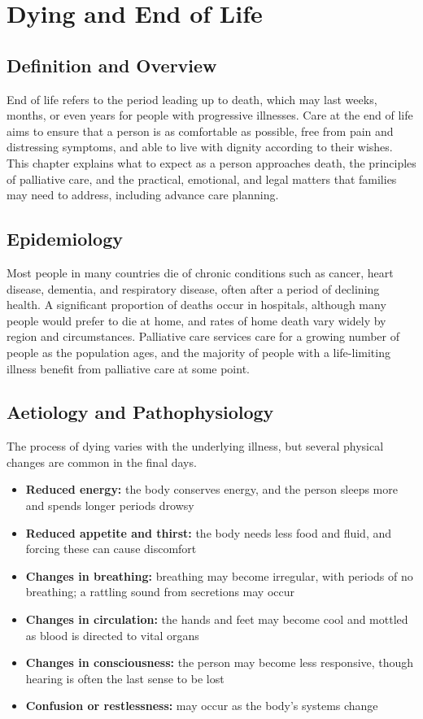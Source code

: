 \chapter{Dying and End of Life}

\section*{Definition and Overview}
End of life refers to the period leading up to death, which may last weeks, months, or even years for people with progressive illnesses. Care at the end of life aims to ensure that a person is as comfortable as possible, free from pain and distressing symptoms, and able to live with dignity according to their wishes. This chapter explains what to expect as a person approaches death, the principles of palliative care, and the practical, emotional, and legal matters that families may need to address, including advance care planning.

\section*{Epidemiology}
Most people in many countries die of chronic conditions such as cancer, heart disease, dementia, and respiratory disease, often after a period of declining health. A significant proportion of deaths occur in hospitals, although many people would prefer to die at home, and rates of home death vary widely by region and circumstances. Palliative care services care for a growing number of people as the population ages, and the majority of people with a life-limiting illness benefit from palliative care at some point.

\section*{Aetiology and Pathophysiology}
The process of dying varies with the underlying illness, but several physical changes are common in the final days.
\begin{itemize}
    \item \textbf{Reduced energy:} the body conserves energy, and the person sleeps more and spends longer periods drowsy
    \item \textbf{Reduced appetite and thirst:} the body needs less food and fluid, and forcing these can cause discomfort
    \item \textbf{Changes in breathing:} breathing may become irregular, with periods of no breathing; a rattling sound from secretions may occur
    \item \textbf{Changes in circulation:} the hands and feet may become cool and mottled as blood is directed to vital organs
    \item \textbf{Changes in consciousness:} the person may become less responsive, though hearing is often the last sense to be lost
    \item \textbf{Confusion or restlessness:} may occur as the body's systems change
\end{itemize}

